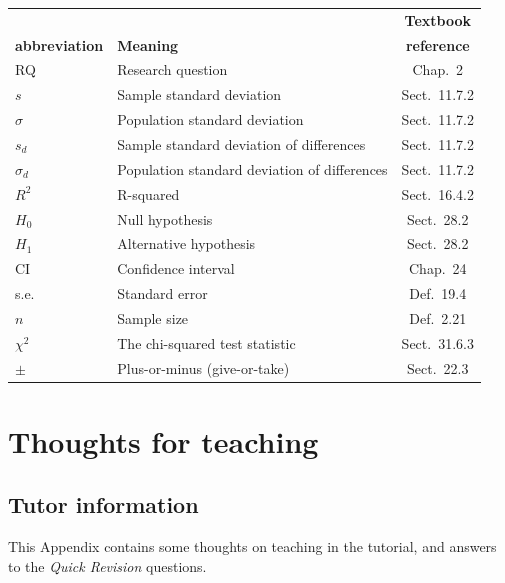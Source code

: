 \documentclass[
  11pt,
  a4paper,
  krantz2]{krantz}
\begin{document}
\begin{table}
\centering\begingroup\fontsize{9}{11}\selectfont

\begin{tabular}{>{\centering\arraybackslash}p{25mm}lc}
\toprule
\multicolumn{1}{c}{\textbf{Symbol or}} & \multicolumn{1}{c}{\textbf{ }} & \multicolumn{1}{c}{\textbf{Textbook}} \\
\textbf{abbreviation} & \textbf{Meaning} & \textbf{reference}\\
\midrule
RQ & Research question & Chap.~2\\
\addlinespace
$s$ & Sample standard deviation & Sect.~11.7.2\\
$\sigma$ & Population standard deviation & Sect.~11.7.2\\
\addlinespace
$s_d$ & Sample standard deviation of differences & Sect.~11.7.2\\
$\sigma_d$ & Population standard deviation of differences & Sect.~11.7.2\\
\addlinespace
$R^2$ & R-squared & Sect.~16.4.2\\
\addlinespace
$H_0$ & Null hypothesis & Sect.~28.2\\
$H_1$ & Alternative hypothesis & Sect.~28.2\\
\addlinespace
CI & Confidence interval & Chap.~24\\
s.e. & Standard error & Def.~19.4\\
$n$ & Sample size & Def.~2.21\\
\addlinespace
$\chi^2$ & The chi-squared test statistic & Sect.~31.6.3\\
$\pm$ & Plus-or-minus (give-or-take) & Sect.~22.3\\
\bottomrule
\end{tabular}
\endgroup{}
\end{table}

\chapter{Thoughts for teaching}\label{TeachingThoughts}

\section*{Tutor information}\label{TutorInfo}

This Appendix contains some thoughts on teaching in the tutorial, and answers to the \emph{Quick Revision} questions.
\end{document}

